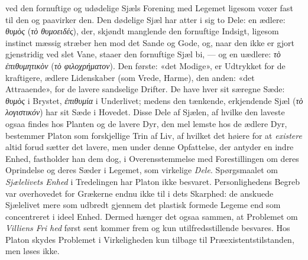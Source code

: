 \documentclass[12pt,a4paper]{book}
\newcommand{\gk}[1]{\textit{#1}}
\begin{document}
ved den fornuftige og udødelige Sjæls Forening med Legemet
ligesom voxer fast til den og paavirker den. Den dødelige
Sjæl har atter i sig to Dele: en ædlere: \gk{θυμὸς} (\gk{τὸ θυμοειδές}),
der, skjøndt manglende den fornuftige Indsigt, ligesom instinct\-%
mæssig stræber hen mod det Sande og Gode, og, naar den
ikke er gjort gjenstridig ved slet Vane, staaer den fornuftige
Sjæl bi, --- og en uædlere: \gk{τὸ ἐπιθυμητικὸν} (\gk{τὸ φιλοχρήματον}).
Den første: «det Modige», er Udtrykket for de kraftigere,
ædlere Lidenskaber (som Vrede, Harme), den anden: «det
Attraaende», for de lavere sandselige Drifter. De have hver
sit særegne Sæde: \gk{θυμὸς} i Brystet, \gk{ἐπιθυμία} i Underlivet;
medens den tænkende, erkjendende Sjæl (\gk{τὸ λογιστικόν}) har
sit Sæde i Hovedet. Disse Dele af Sjælen, af hvilke den
laveste ogsaa findes hos Planten og de lavere Dyr, den mel\-%
lemste hos de ædlere Dyr, bestemmer Platon som forskjellige
Trin af Liv, af hvilket det høiere for at \emph{existere} altid forud\-%
sætter det lavere, men under denne Opfattelse, der antyder en
indre Enhed, fastholder han dem dog, i Overensstemmelse med
Forestillingen om deres Oprindelse og deres Sæder i Legemet,
som virkelige \emph{Dele}. Spørgsmaalet om \emph{Sjælelivets Enhed}
i Tredelingen har Platon ikke besvaret. Personlighedens Begreb
var overhovedet for Grækerne endnu ikke til i dets Skarphed:
de anskuede Sjælelivet mere som udbredt gjennem det plastisk
formede Legeme end som concentreret i ideel Enhed. Dermed
hænger det ogsaa sammen, at Problemet om \emph{Villiens Fri\-%
hed} først sent kommer frem og kun utilfredsstillende besvares.
Hos Platon skydes Problemet i Virkeligheden kun tilbage til
Præexistentstilstanden, men løses ikke.
\end{document}

